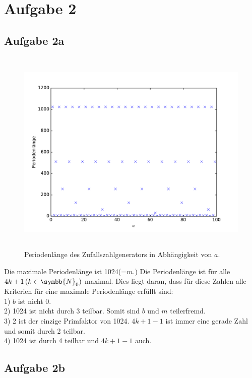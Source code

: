 



  \section{Aufgabe 2}

    \subsection{Aufgabe 2a}

    \begin{figure}[H]
      \centering
      \includegraphics[height=10cm]{aPerioden.pdf}
      \caption{Periodenlänge des Zufallszahlgenerators in Abhängigkeit von $a$.}
      \label{fig:perioden}
    \end{figure}

    Die maximale Periodenlänge ist 1024(=$m.$) Die Periodenlänge ist für alle
    $4k+1\,(k\in\symbb{N}_0)$ maximal. Dies liegt daran, dass für diese Zahlen
    alle Kriterien für eine maximale Periodenlänge erfüllt sind:\\
    1) $b$ ist nicht 0.\\
    2) 1024 ist nicht durch 3 teilbar. Somit sind $b$ und $m$ teilerfremd.\\
    3) 2 ist der einzige Primfaktor von 1024. $4k+1-1$ ist immer eine gerade
    Zahl und somit durch 2 teilbar.\\
    4) 1024 ist durch 4 teilbar und $4k+1-1$ auch.\\

    \subsection{Aufgabe 2b}


